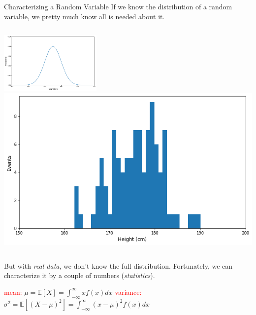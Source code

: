 \documentclass{beamer}
\begin{document}
\begin{frame}{Characterizing a Random Variable}
	If we know the distribution of a random variable, we pretty much know all is needed about it. 
	\newline
	\begin{columns}
		\includegraphics[height=3cm]{images/continouos_random_variable}
		\includegraphics[height=3 cm]{images/real_data}
	\end{columns}
	\vspace{0.5cm}
        
	But with \textit{real data}, we don't know the full distribution. Fortunately, we can characterize it by a couple of numbers (\emph{statistics}).
	\small{
		\begin{center}
			\textcolor{red}{mean:} $\boxed{\mu = \mathbb{E}[X] = \int_{-\infty}^{\infty} xf(x)dx}$\quad
			\textcolor{red}{variance:}  
			$\boxed{\sigma^2 = \mathbb{E}[(X-\mu)^2] =\int_{-\infty}^{\infty} (x-\mu)^2f(x)dx}$
	\end{center}
}
\end{frame}
\end{document}
